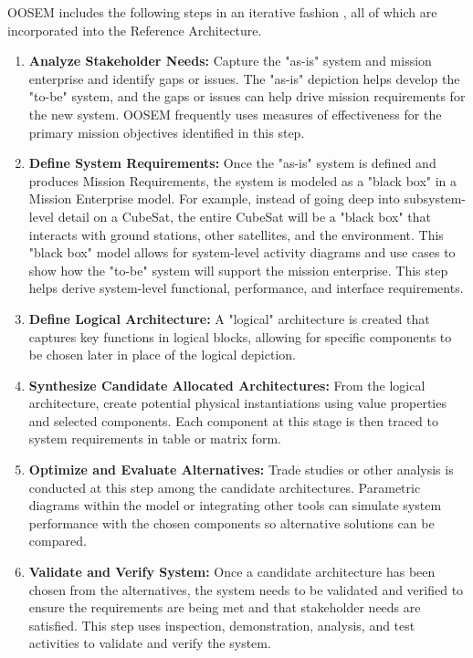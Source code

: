 \documentclass[conference]{joss-pretty}
\begin{document}
OOSEM includes the following steps in an iterative fashion \cite{OMGwiki}, all of which are incorporated into the Reference Architecture.
\begin{enumerate}
\item{\textbf{Analyze Stakeholder Needs:} Capture the "as-is" system and mission enterprise and identify gaps or issues. The "as-is" depiction helps develop the "to-be" system, and the gaps or issues can help drive mission requirements for the new system. OOSEM frequently uses measures of effectiveness for the primary mission objectives identified in this step.}
\item{\textbf{Define System Requirements:} Once the "as-is" system is defined and produces Mission Requirements, the system is modeled as a "black box" in a Mission Enterprise model. For example, instead of going deep into subsystem-level detail on a CubeSat, the entire CubeSat will be a "black box" that interacts with ground stations, other satellites, and the environment. This "black box" model allows for system-level activity diagrams and use cases to show how the "to-be" system will support the mission enterprise. This step helps derive system-level functional, performance, and interface requirements.}
\item{\textbf{Define Logical Architecture:} A "logical" architecture is created that captures key functions in logical blocks, allowing for specific components to be chosen later in place of the logical depiction.}
\item{\textbf{Synthesize Candidate Allocated Architectures:} From the logical architecture, create potential physical instantiations using value properties and selected components. Each component at this stage is then traced to system requirements in table or matrix form.}
\item{\textbf{Optimize and Evaluate Alternatives:} Trade studies or other analysis is conducted at this step among the candidate architectures. Parametric diagrams within the model or integrating other tools can simulate system performance with the chosen components so alternative solutions can be compared.}
\item{\textbf{Validate and Verify System:} Once a candidate architecture has been chosen from the alternatives, the system needs to be validated and verified to ensure the requirements are being met and that stakeholder needs are satisfied. This step uses inspection, demonstration, analysis, and test activities to validate and verify the system.}
\end{enumerate}
\end{document}
